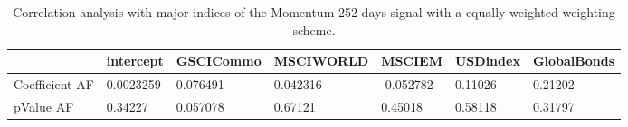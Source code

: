 \begin{table}[H]
\centering
\begin{tabular}{lllllll}
& intercept & GSCICommo & MSCIWORLD & MSCIEM & USDindex & GlobalBonds \\ 
\hline 
Coefficient AF & 0.0023259 & 0.076491 & 0.042316 & -0.052782 & 0.11026 & 0.21202 \\ 
pValue AF & 0.34227 & 0.057078 & 0.67121 & 0.45018 & 0.58118 & 0.31797 \\ 
\hline
\end{tabular}
\caption{Correlation analysis with major indices of the Momentum 252 days signal with a equally weighted weighting scheme.}
\label{MOM252EW_AFACTOR}
\end{table}